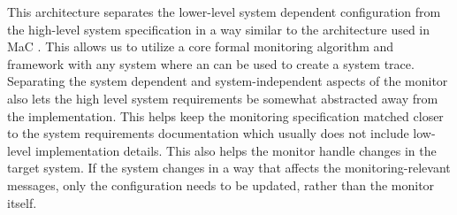 This architecture separates the lower-level system dependent configuration from the high-level system specification in a way similar to the architecture used in MaC \cite{Kim2004}.
This allows us to utilize a core formal monitoring algorithm and framework with any system where an \sfmap can be used to create a system trace.
Separating the system dependent and system-independent aspects of the monitor also lets the high level system requirements be somewhat abstracted away from the implementation. 
This helps keep the monitoring specification matched closer to the system requirements documentation which usually does not include low-level implementation details. 
This also helps the monitor handle changes in the target system. If the system changes in a way that affects the monitoring-relevant messages, only the \sfmap configuration needs to be updated, rather than the monitor itself.

